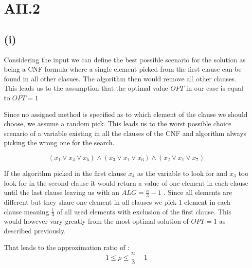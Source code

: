 \section* {AII.2}
\label {a2-2}
\subsection*{(i)}

Considering the input we can define the best possible scenario for the solution as being a CNF formula where a single element picked from the first clause can be found in all other clasues. The algorithm then would remove all other clauses. This leads us to the assumption that the optimal value $ OPT $ in our case is equal to $ OPT = 1 $ 

Since no assigned method is specified as to which element of the clause we should choose, we assume a random pick. This leads us to the worst possible choice scenario of a variable existing in all the clauses of the CNF and algorithm always picking the wrong one for the search.   

$$ (x_1 \vee x_4  \vee x_5) \wedge (x_3 \vee x_1 \vee x_6) \wedge (x_2 \vee x_1 \vee x_7) $$

If the algorithm picked in the first clause $ x_4 $ as the variable to look for and  $ x_3 $ too look for in the second clause  it would return a value of one element in each clause until the last clause leaving us with an $ ALG = \frac{n}{3}-1 $ . Since all elements are different but they share one element in all clauses we pick 1 element in each clause meaning $ \frac{1}{3} $ of all used elements with exclusion of the first clause. 
This would however vary greatly from the most optimal solution of $ OPT = 1 $ as described previously. 

That leads to the approximation ratio of :
$$ 1 \le \rho \le \frac{n}{3} -1 $$ 


